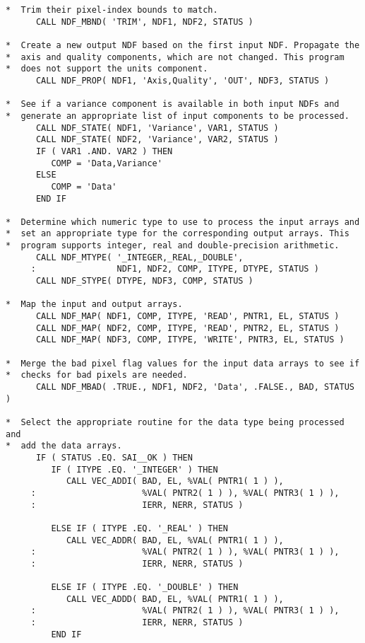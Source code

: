 \documentclass[twoside,11pt]{article}
\begin{document}
\begin{verbatim}
*  Trim their pixel-index bounds to match.
      CALL NDF_MBND( 'TRIM', NDF1, NDF2, STATUS )

*  Create a new output NDF based on the first input NDF. Propagate the
*  axis and quality components, which are not changed. This program
*  does not support the units component.
      CALL NDF_PROP( NDF1, 'Axis,Quality', 'OUT', NDF3, STATUS )

*  See if a variance component is available in both input NDFs and
*  generate an appropriate list of input components to be processed.
      CALL NDF_STATE( NDF1, 'Variance', VAR1, STATUS )
      CALL NDF_STATE( NDF2, 'Variance', VAR2, STATUS )
      IF ( VAR1 .AND. VAR2 ) THEN
         COMP = 'Data,Variance'
      ELSE
         COMP = 'Data'
      END IF

*  Determine which numeric type to use to process the input arrays and
*  set an appropriate type for the corresponding output arrays. This
*  program supports integer, real and double-precision arithmetic.
      CALL NDF_MTYPE( '_INTEGER,_REAL,_DOUBLE',
     :                NDF1, NDF2, COMP, ITYPE, DTYPE, STATUS )
      CALL NDF_STYPE( DTYPE, NDF3, COMP, STATUS )

*  Map the input and output arrays.
      CALL NDF_MAP( NDF1, COMP, ITYPE, 'READ', PNTR1, EL, STATUS )
      CALL NDF_MAP( NDF2, COMP, ITYPE, 'READ', PNTR2, EL, STATUS )
      CALL NDF_MAP( NDF3, COMP, ITYPE, 'WRITE', PNTR3, EL, STATUS )

*  Merge the bad pixel flag values for the input data arrays to see if
*  checks for bad pixels are needed.
      CALL NDF_MBAD( .TRUE., NDF1, NDF2, 'Data', .FALSE., BAD, STATUS )

*  Select the appropriate routine for the data type being processed and
*  add the data arrays.
      IF ( STATUS .EQ. SAI__OK ) THEN
         IF ( ITYPE .EQ. '_INTEGER' ) THEN
            CALL VEC_ADDI( BAD, EL, %VAL( PNTR1( 1 ) ),
     :                     %VAL( PNTR2( 1 ) ), %VAL( PNTR3( 1 ) ),
     :                     IERR, NERR, STATUS )

         ELSE IF ( ITYPE .EQ. '_REAL' ) THEN
            CALL VEC_ADDR( BAD, EL, %VAL( PNTR1( 1 ) ),
     :                     %VAL( PNTR2( 1 ) ), %VAL( PNTR3( 1 ) ),
     :                     IERR, NERR, STATUS )

         ELSE IF ( ITYPE .EQ. '_DOUBLE' ) THEN
            CALL VEC_ADDD( BAD, EL, %VAL( PNTR1( 1 ) ),
     :                     %VAL( PNTR2( 1 ) ), %VAL( PNTR3( 1 ) ),
     :                     IERR, NERR, STATUS )
         END IF


\end{verbatim}
\end{document}
